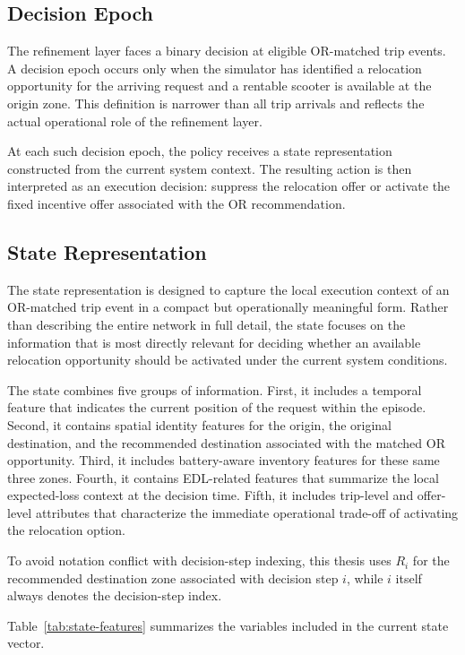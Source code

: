 \subsection{Decision Epoch}

The refinement layer faces a binary decision at eligible OR-matched trip events. A decision epoch occurs only when the simulator has identified a relocation opportunity for the arriving request and a rentable scooter is available at the origin zone. This definition is narrower than all trip arrivals and reflects the actual operational role of the refinement layer.

At each such decision epoch, the policy receives a state representation constructed from the current system context. The resulting action is then interpreted as an execution decision: suppress the relocation offer or activate the fixed incentive offer associated with the OR recommendation.

\subsection{State Representation}

The state representation is designed to capture the local execution context of an OR-matched trip event in a compact but operationally meaningful form. Rather than describing the entire network in full detail, the state focuses on the information that is most directly relevant for deciding whether an available relocation opportunity should be activated under the current system conditions.

The state combines five groups of information. First, it includes a temporal feature that indicates the current position of the request within the episode. Second, it contains spatial identity features for the origin, the original destination, and the recommended destination associated with the matched OR opportunity. Third, it includes battery-aware inventory features for these same three zones. Fourth, it contains EDL-related features that summarize the local expected-loss context at the decision time. Fifth, it includes trip-level and offer-level attributes that characterize the immediate operational trade-off of activating the relocation option.

To avoid notation conflict with decision-step indexing, this thesis uses \(R_i\) for the recommended destination zone associated with decision step \(i\), while \(i\) itself always denotes the decision-step index.

Table~\ref{tab:state-features} summarizes the variables included in the current state vector.

